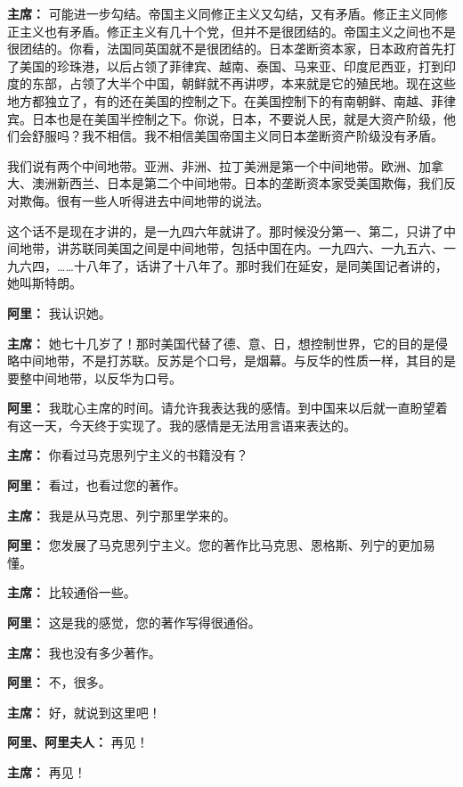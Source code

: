 \begin{duihua}
\item[\textbf{主席：}] 可能进一步勾结。帝国主义同修正主义又勾结，又有矛盾。修正主义同修正主义也有矛盾。修正主义有几十个党，但并不是很团结的。帝国主义之间也不是很团结的。你看，法国同英国就不是很团结的。日本垄断资本家，日本政府首先打了美国的珍珠港，以后占领了菲律宾、越南、泰国、马来亚、印度尼西亚，打到印度的东部，占领了大半个中国，朝鲜就不再讲啰，本来就是它的殖民地。现在这些地方都独立了，有的还在美国的控制之下。在美国控制下的有南朝鲜、南越、菲律宾。日本也是在美国半控制之下。你说，日本，不要说人民，就是大资产阶级，他们会舒服吗？我不相信。我不相信美国帝国主义同日本垄断资产阶级没有矛盾。

我们说有两个中间地带。亚洲、非洲、拉丁美洲是第一个中间地带。欧洲、加拿大、澳洲新西兰、日本是第二个中间地带。日本的垄断资本家受美国欺侮，我们反对欺侮。很有一些人听得进去中间地带的说法。

这个话不是现在才讲的，是一九四六年就讲了。那时候没分第一、第二，只讲了中间地带，讲苏联同美国之间是中间地带，包括中国在内。一九四六、一九五六、一九六四，……十八年了，话讲了十八年了。那时我们在延安，是同美国记者讲的，她叫斯特朗。

\item[\textbf{阿里：}] 我认识她。

\item[\textbf{主席：}] 她七十几岁了！那时美国代替了德、意、日，想控制世界，它的目的是侵略中间地带，不是打苏联。反苏是个口号，是烟幕。与反华的性质一样，其目的是要整中间地带，以反华为口号。

\item[\textbf{阿里：}] 我耽心主席的时间。请允许我表达我的感情。到中国来以后就一直盼望着有这一天，今天终于实现了。我的感情是无法用言语来表达的。

\item[\textbf{主席：}] 你看过马克思列宁主义的书籍没有？

\item[\textbf{阿里：}] 看过，也看过您的著作。

\item[\textbf{主席：}] 我是从马克思、列宁那里学来的。

\item[\textbf{阿里：}] 您发展了马克思列宁主义。您的著作比马克思、恩格斯、列宁的更加易懂。

\item[\textbf{主席：}] 比较通俗一些。

\item[\textbf{阿里：}] 这是我的感觉，您的著作写得很通俗。

\item[\textbf{主席：}] 我也没有多少著作。

\item[\textbf{阿里：}] 不，很多。

\item[\textbf{主席：}] 好，就说到这里吧！

\item[\textbf{阿里、阿里夫人：}] 再见！

\item[\textbf{主席：}] 再见！

\end{duihua}
